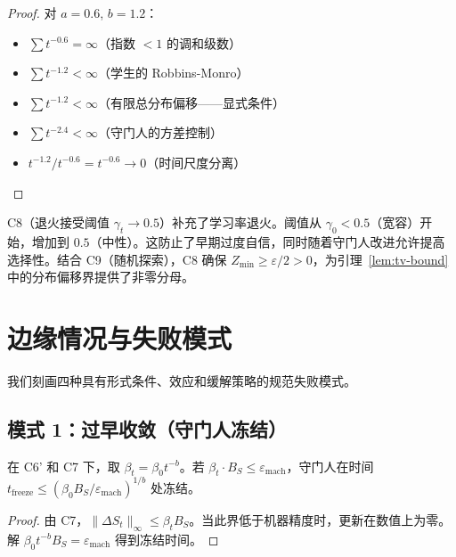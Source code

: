 \begin{proof}
对 $a = 0.6$, $b = 1.2$：
\begin{itemize}[nosep]
    \item $\sum t^{-0.6} = \infty$（指数 $< 1$ 的调和级数）
    \item $\sum t^{-1.2} < \infty$（学生的 Robbins-Monro）
    \item $\sum t^{-1.2} < \infty$（有限总分布偏移——显式条件）
    \item $\sum t^{-2.4} < \infty$（守门人的方差控制）
    \item $t^{-1.2} / t^{-0.6} = t^{-0.6} \to 0$（时间尺度分离）
\end{itemize}
\end{proof}

\begin{remark}[退火接受阈值的作用]
C8（退火接受阈值 $\gamma_t \to 0.5$）补充了学习率退火。阈值从 $\gamma_0 < 0.5$（宽容）开始，增加到 $0.5$（中性）。这防止了早期过度自信，同时随着守门人改进允许提高选择性。结合 C9（随机探索），C8 确保 $Z_{\min} \geq \varepsilon/2 > 0$，为引理~\ref{lem:tv-bound} 中的分布偏移界提供了非零分母。
\end{remark}

\section{边缘情况与失败模式}\label{sec:failure}

我们刻画四种具有形式条件、效应和缓解策略的规范失败模式。

\subsection{模式 1：过早收敛（守门人冻结）}

\begin{theorem}[冻结条件]\label{thm:freeze}
在 C6' 和 C7 下，取 $\beta_t = \beta_0 t^{-b}$。若 $\beta_t \cdot B_S \leq \varepsilon_{\text{mach}}$，守门人在时间 $t_{\text{freeze}} \leq (\beta_0 B_S / \varepsilon_{\text{mach}})^{1/b}$ 处冻结。
\end{theorem}

\begin{proof}
由 C7，$\|\Delta S_t\|_\infty \leq \beta_t B_S$。当此界低于机器精度时，更新在数值上为零。解 $\beta_0 t^{-b} B_S = \varepsilon_{\text{mach}}$ 得到冻结时间。
\end{proof}

